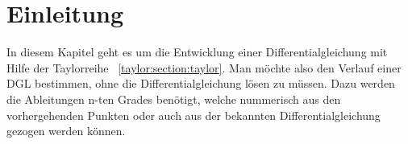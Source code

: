 %
%
%
\section{Einleitung
\label{taylor:section:einleitung}}
In diesem Kapitel geht es um die Entwicklung einer Differentialgleichung mit Hilfe der Taylorreihe ~\ref{taylor:section:taylor}.
Man möchte also den Verlauf einer DGL bestimmen, ohne die Differentialgleichung lösen zu müssen.
Dazu werden die Ableitungen n-ten Grades benötigt, welche nummerisch aus den vorhergehenden Punkten oder auch aus der bekannten Differentialgleichung gezogen werden können.

